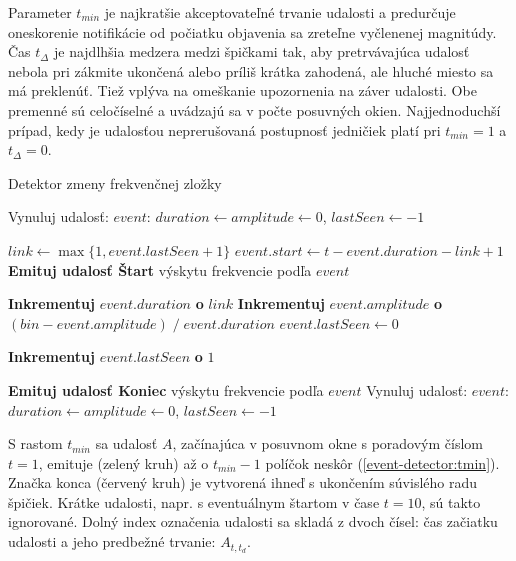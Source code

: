 Parameter $t_{min}$ je najkratšie akceptovateľné trvanie udalosti a predurčuje oneskorenie notifikácie od počiatku objavenia sa zreteľne
vyčlenenej magnitúdy. Čas $t_{\Delta}$ je najdlhšia medzera medzi špičkami tak, aby pretrvávajúca udalosť nebola pri zákmite ukončená alebo
príliš krátka zahodená, ale hluché miesto sa má preklenúť. Tiež vplýva na omeškanie upozornenia na záver udalosti.
Obe premenné sú celočíselné a uvádzajú sa v počte posuvných okien. Najjednoduchší prípad, kedy je udalosťou
neprerušovaná postupnosť jedničiek platí pri $t_{min} = 1$ a $t_{\Delta} = 0$.
\begin{algorithm}[h]
\caption{Detektor zmeny frekvenčnej zložky}
\begin{algorithmic}[1]
	\State Vynuluj udalosť: $event$: $duration \gets amplitude \gets 0$, $lastSeen \gets -1$
\EndIf

	\State $link \gets \max\{1, event.lastSeen + 1\}$
		\State $event.start \gets t - event.duration - link + 1$
		\State \textbf{Emituj udalosť Štart} výskytu frekvencie podľa $event$
	\EndIf

	\State \textbf{Inkrementuj} $event.duration$ \textbf{o} $link$
	\State \textbf{Inkrementuj} $event.amplitude$ \textbf{o} $(bin - event.amplitude)\;/\;event.duration$
	\State $event.lastSeen \gets 0$

	\State \textbf{Inkrementuj} $event.lastSeen$ \textbf{o}  $1$

        		\State \textbf{Emituj udalosť Koniec} výskytu frekvencie podľa $event$
        	\EndIf
        \Else
        	\State Vynuluj udalosť: $event$: $duration \gets amplitude \gets 0$, $lastSeen \gets -1$
        \EndIf
\EndIf
\end{algorithmic}
\label{algo:event-detector}
\end{algorithm}

S rastom $t_{min}$ sa udalosť $A$, začínajúca v posuvnom okne s poradovým číslom
$t = 1$, emituje (zelený kruh) až o $t_{min} - 1$ políčok neskôr (\ref{event-detector:tmin}).
Značka konca (červený kruh) je vytvorená ihneď s ukončením súvislého radu špičiek. Krátke udalosti, napr. s eventuálnym štartom
v čase $t = 10$, sú takto ignorované. Dolný index označenia udalosti sa skladá z dvoch čísel: čas začiatku udalosti a jeho predbežné
trvanie: $A_{t,t_d}$.

